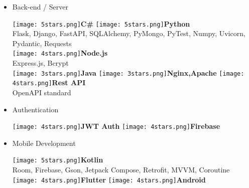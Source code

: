 \documentclass[]{friggeri-cv}
\begin{document}
\begin{flushleft}
\begin{multicols}{3}
\begin{itemize}
\columnbreak
\item \large Back-end / Server \
\normalsize
\begin{flushleft}

\texttt{[image: 5stars.png]}\hspace{1.5mm}\textbf{C\#}
\texttt{[image: 5stars.png]}\hspace{1.5mm}\textbf{Python}\\Flask, Django, FastAPI, SQLAlchemy, PyMongo, PyTest, Numpy, Uvicorn, Pydantic, Requests\\\vspace{2mm}
\texttt{[image: 4stars.png]}\hspace{1.5mm}\textbf{Node.js}\\Express.js, Bcrypt\\
\texttt{[image: 3stars.png]}\hspace{1.5mm}\textbf{Java}
\texttt{[image: 3stars.png]}\hspace{1.5mm}\textbf{\small Nginx,Apache}
\texttt{[image: 4stars.png]}\hspace{1.5mm}\textbf{Rest API}\\OpenAPI standard\\
\end{flushleft}            

\item \large Authentication \
\normalsize
\begin{flushleft}

\texttt{[image: 4stars.png]}\hspace{1.5mm}\textbf{JWT Auth}
\texttt{[image: 4stars.png]}\hspace{1.5mm}\textbf{Firebase}
\end{flushleft}            

\columnbreak
\item \large Mobile Development \
\normalsize
\begin{flushleft}

\texttt{[image: 5stars.png]}\hspace{1.5mm}\textbf{Kotlin}\\Room, Firebase, Gson, Jetpack Compose, Retrofit, MVVM, Coroutine\\\vspace{2mm}
\texttt{[image: 4stars.png]}\hspace{1.5mm}\textbf{Flutter}
\texttt{[image: 4stars.png]}\hspace{1.5mm}\textbf{Android}
\end{flushleft}            


\end{itemize}
\end{multicols}
\end{flushleft}
\end{document}
